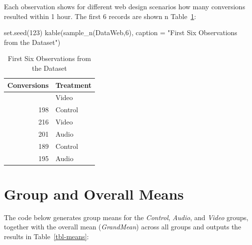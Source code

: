\documentclass[
  letterpaper,
  DIV=11,
  numbers=noendperiod]{scrartcl}
\newenvironment{Shaded}{\begin{snugshade}}{\end{snugshade}}
\newcommand{\AttributeTok}[1]{\textcolor[rgb]{0.40,0.45,0.13}{#1}}
\newcommand{\DecValTok}[1]{\textcolor[rgb]{0.68,0.00,0.00}{#1}}
\newcommand{\FunctionTok}[1]{\textcolor[rgb]{0.28,0.35,0.67}{#1}}
\newcommand{\NormalTok}[1]{\textcolor[rgb]{0.00,0.23,0.31}{#1}}
\newcommand{\StringTok}[1]{\textcolor[rgb]{0.13,0.47,0.30}{#1}}
\begin{document}
Each observation shows for different web design scenarios how many
conversions resulted within 1 hour. The first 6 records are shown n
Table~\ref{tbl-firstsix}:

\begin{Shaded}
\begin{Highlighting}[]
\FunctionTok{set.seed}\NormalTok{(}\DecValTok{123}\NormalTok{)}
\FunctionTok{kable}\NormalTok{(}\FunctionTok{sample\_n}\NormalTok{(DataWeb,}\DecValTok{6}\NormalTok{), }\AttributeTok{caption =} \StringTok{"First Six Observations from the Dataset"}\NormalTok{) }
\end{Highlighting}
\end{Shaded}

\begin{longtable}[]{@{}rl@{}}

\caption{\label{tbl-firstsix}First Six Observations from the Dataset}

\tabularnewline

\toprule\noalign{}
Conversions & Treatment \\
\midrule\noalign{}
\endhead
\bottomrule\noalign{}
\endlastfoot
215 & Video \\
198 & Control \\
216 & Video \\
201 & Audio \\
189 & Control \\
195 & Audio \\

\end{longtable}

\section{Group and Overall Means}\label{group-and-overall-means}

The code below generates group means for the \emph{Control},
\emph{Audio}, and \emph{Video} groups, together with the overall mean
(\emph{GrandMean}) across all groups and outputs the results in
Table~\ref{tbl-means}:
\end{document}
